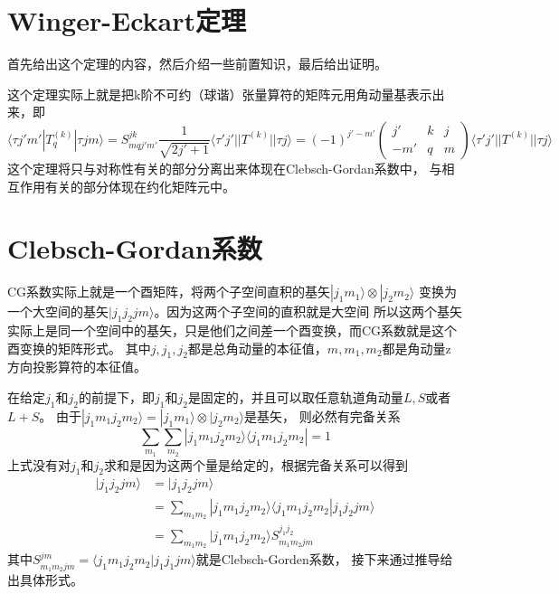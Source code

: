 \documentclass{article}
\begin{document}
\section*{Winger-Eckart定理}
首先给出这个定理的内容，然后介绍一些前置知识，最后给出证明。

这个定理实际上就是把k阶不可约（球谐）张量算符的矩阵元用角动量基表示出来，即
\begin{equation}
    \langle \tau j'm'|T_{q}^{(k)}|\tau jm\rangle 
    = S_{mqj'm'}^{jk} \frac{1}{\sqrt{2j'+1}}\langle\tau' j'||T^{(k)}||\tau j\rangle
    = (-1)^{j'-m'}
    \begin{pmatrix}
        j' & k & j\\
        -m' & q & m
    \end{pmatrix}
    \langle\tau' j'||T^{(k)}||\tau j\rangle
\end{equation}
这个定理将只与对称性有关的部分分离出来体现在Clebsch-Gordan系数中，
与相互作用有关的部分体现在约化矩阵元中。


\section*{Clebsch-Gordan系数}
CG系数实际上就是一个酉矩阵，将两个子空间直积的基矢$|j_1 m_1\rangle\otimes |j_2 m_2\rangle$
变换为一个大空间的基矢$|j_1 j_2 jm\rangle$。因为这两个子空间的直积就是大空间
所以这两个基矢实际上是同一个空间中的基矢，只是他们之间差一个酉变换，而CG系数就是这个酉变换的矩阵形式。
其中$j,j_1,j_2$都是总角动量的本征值，$m,m_1,m_2$都是角动量z方向投影算符的本征值。

在给定$j_1$和$j_2$的前提下，即$j_1$和$j_2$是固定的，并且可以取任意轨道角动量$L,S$或者$L+S$。
由于$|j_1 m_1 j_2 m_2\rangle = |j_1 m_1\rangle\otimes |j_2 m_2\rangle$是基矢，
则必然有完备关系
\begin{equation}
    \sum_{m_1}\sum_{m_2}|j_1 m_1 j_2 m_2\rangle\langle j_1 m_1 j_2 m_2| = 1
\end{equation}
上式没有对$j_1$和$j_2$求和是因为这两个量是给定的，根据完备关系可以得到
\begin{equation}
    \begin{aligned}
        |j_1 j_2 jm\rangle
        &= |j_1 j_2 jm\rangle\\
        &= \sum_{m_1 m_2}|j_1 m_1 j_2 m_2\rangle\langle j_1 m_1 j_2 m_2|j_1 j_2 jm\rangle\\
        &= \sum_{m_1 m_2}|j_1 m_1 j_2 m_2\rangle S_{m_1 m_2 jm}^{j_1 j_2}
    \end{aligned}
\end{equation}
其中$S_{m_1 m_2 jm}^{jm}=\langle j_1 m_1 j_2 m_2|j_1 j_1 jm\rangle$就是Clebsch-Gorden系数，
接下来通过推导给出具体形式。
\end{document}
